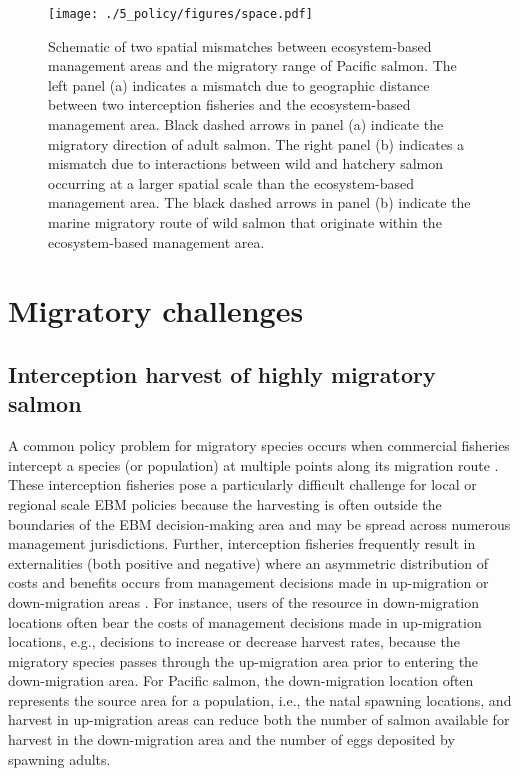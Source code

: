 \begin{figure}[htbp]
  \centering \texttt{[image: ./5\_policy/figures/space.pdf]}
  \caption[Schematic of two spatial mismatches between ecosystem-based
           management areas and the migratory range of Pacific
           salmon.]{Schematic of two spatial mismatches between ecosystem-based
           management areas and the migratory range of Pacific salmon. The left
           panel (a) indicates a mismatch due to geographic distance between two
           interception fisheries and the ecosystem-based management area. Black
           dashed arrows in panel (a) indicate the migratory direction of adult
           salmon. The right panel (b) indicates a mismatch due to interactions
           between wild and hatchery salmon occurring at a larger spatial scale
           than the ecosystem-based management area. The black dashed arrows in
           panel (b) indicate the marine migratory route of wild salmon that
           originate within the ecosystem-based management area.}
  \label{fig:ebm:1}
\end{figure}



\section{Migratory challenges}

\subsection{Interception harvest of highly migratory salmon}

A common policy problem for migratory species occurs when commercial fisheries
intercept a species (or population) at multiple points along its migration route
\citep{Lascelles2014}. These interception fisheries pose a particularly
difficult challenge for local or regional scale EBM policies because the
harvesting is often outside the boundaries of the EBM decision-making area and
may be spread across numerous management jurisdictions. Further, interception
fisheries frequently result in externalities (both positive and negative) where
an asymmetric distribution of costs and benefits occurs from management
decisions made in up-migration or down-migration areas \citep{Scherer1990}. For
instance, users of the resource in down-migration locations often bear the costs
of management decisions made in up-migration locations, e.g., decisions to
increase or decrease harvest rates, because the migratory species passes through
the up-migration area prior to entering the down-migration area. For Pacific
salmon, the down-migration location often represents the source area for a
population, i.e., the natal spawning locations, and harvest in up-migration
areas can reduce both the number of salmon available for harvest in the
down-migration area and the number of eggs deposited by spawning adults.

